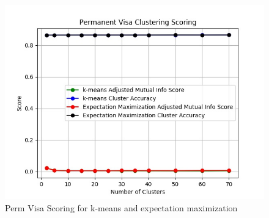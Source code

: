 \documentclass[h]{article}
\begin{document}
\begin{figure}[H]
      \includegraphics[width=1\textwidth,keepaspectratio]{permanent_visa_clustering_scoring.jpg} 
      \caption*{Perm Visa Scoring for k-means and expectation maximization} 
   \endminipage\hfill
\end{figure}
\end{document}
